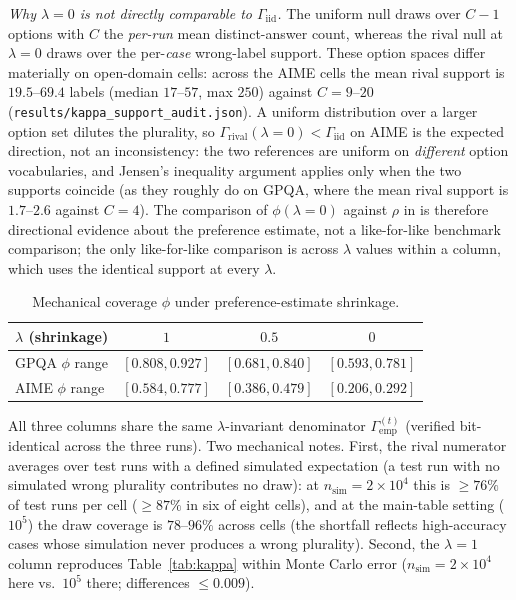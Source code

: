 \documentclass[a4paper,fleqn]{cas-sc}
\newcommand{\agreementIndex}{\Gamma}
\begin{document}
\emph{Why $\lambda=0$ is not directly comparable to $\agreementIndex_{\mathrm{iid}}$.}
The uniform null draws over $C-1$ options with $C$ the \emph{per-run}
mean distinct-answer count, whereas the rival null at $\lambda=0$ draws
over the per-\emph{case} wrong-label support. These option spaces differ
materially on open-domain cells: across the AIME cells the mean rival
support is $19.5$--$69.4$ labels (median $17$--$57$, max $250$) against
$C=9$--$20$ (\texttt{results/kappa\_support\_audit.json}). A uniform
distribution over a larger option set dilutes the plurality, so
$\agreementIndex_{\mathrm{rival}}(\lambda=0)<\agreementIndex_{\mathrm{iid}}$ on AIME is
the expected direction, not an inconsistency: the two references are
uniform on \emph{different} option vocabularies, and Jensen's inequality
argument applies only when the two supports coincide (as they roughly do
on GPQA, where the mean rival support is $1.7$--$2.6$ against $C=4$).
The comparison of $\phi(\lambda=0)$ against $\rho$ in
 is therefore directional evidence about the preference estimate, not a
 like-for-like benchmark comparison; the only like-for-like comparison is
across $\lambda$ values within a column, which uses the identical support
at every $\lambda$.

\begin{table}[t]\begin{minipage}{\linewidth}
\centering
\caption{Mechanical coverage $\phi$ under preference-estimate shrinkage.}
\label{tab:shrink}
\begin{tabular}{lccc}
\toprule
$\lambda$ (shrinkage) & $1$ & $0.5$ & $0$ \\
\midrule
GPQA $\phi$ range & $[0.808,0.927]$ & $[0.681,0.840]$ & $[0.593,0.781]$ \\
AIME $\phi$ range & $[0.584,0.777]$ & $[0.386,0.479]$ & $[0.206,0.292]$ \\
\bottomrule
\end{tabular}
\end{minipage}\end{table}

All three columns share the same $\lambda$-invariant denominator
$\agreementIndex_{\mathrm{emp}}^{(t)}$ (verified bit-identical across the three
runs). Two mechanical notes. First, the rival numerator averages over
test runs with a defined simulated expectation (a test run with no
simulated wrong plurality contributes no draw): at
$n_{\mathrm{sim}}=2\times10^4$ this is $\ge76\%$ of test runs per cell ($\ge87\%$ in six of eight cells),
and at the main-table setting ($10^5$) the draw coverage is $78$--$96\%$ across cells (the shortfall reflects high-accuracy cases whose simulation never produces a wrong plurality). Second, the $\lambda=1$ column reproduces
Table~\ref{tab:kappa} within Monte Carlo error
($n_{\mathrm{sim}}=2\times10^4$ here vs.\ $10^5$ there; differences
$\le0.009$).
\end{document}
